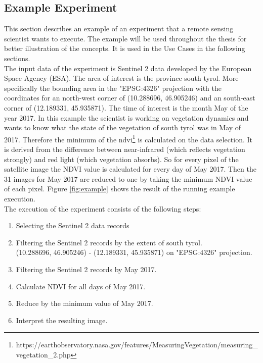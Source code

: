 \documentclass[draft,final]{vutinfth} %
\begin{document}
\subsection{Example Experiment}\label{example}

This section describes an example of an experiment that a remote sensing scientist wants to execute. The example will be used throughout the thesis for better illustration of the concepts. It is used in the Use Cases in the following sections. \\
The input data of the experiment is Sentinel 2 data developed by the European Space Agency (ESA). The area of interest is the province south tyrol. More specifically the bounding area in the "EPSG:4326" projection with the coordinates for an north-west corner of (10.288696, 46.905246) and an south-east corner of (12.189331, 45.935871). The time of interest is the month May of the year 2017. In this example the scientist is working on vegetation dynamics and wants to know what the state of the vegetation of south tyrol was in May of 2017. Therefore the minimum of the  \gls{ndvi}\footnote{https://earthobservatory.nasa.gov/features/MeasuringVegetation/measuring\_vegetation\_2.php} is calculated on the data selection. It is derived from the difference between near-infrared (which reflects vegetation strongly) and red light (which vegetation absorbs). So for every pixel of the satellite image the NDVI value is calculated for every day of May 2017. Then the 31 images for May 2017 are reduced to one by taking the minimum NDVI value of each pixel. Figure \ref{fig:example} shows the result of the running example execution.\\

The execution of the experiment consists of the following steps:

\begin{enumerate}
	\item Selecting the Sentinel 2 data records
	\item Filtering the Sentinel 2 records by the extent of south tyrol. \\(10.288696, 46.905246) - (12.189331, 45.935871) on "EPSG:4326" projection.
	\item Filtering the Sentinel 2 records by May 2017.
	\item Calculate NDVI for all days of May 2017.
	\item Reduce by the minimum value of May 2017.
	\item Interpret the resulting image.
\end{enumerate}
\end{document}
